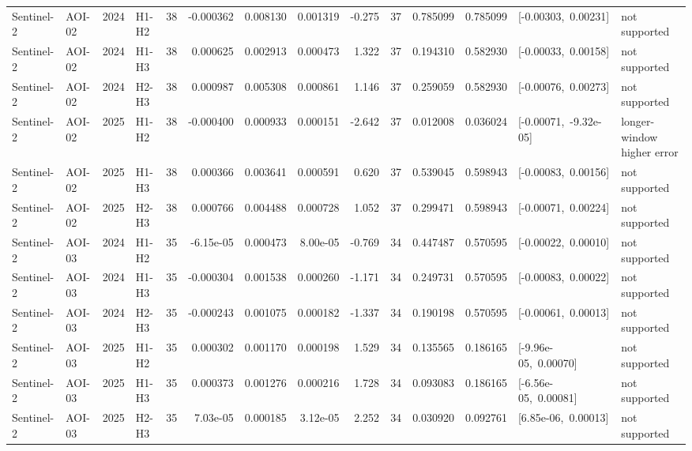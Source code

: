\begin{longtable}{llclrrrrrrrrp{2.35cm}p{1.75cm}}
Sentinel-2 & AOI-02 & 2024 & H1-H2 & 38 & -0.000362 & 0.008130 & 0.001319 & -0.275 & 37 & 0.785099 & 0.785099 & \mbox{[-0.00303, 0.00231]} & not supported \\
Sentinel-2 & AOI-02 & 2024 & H1-H3 & 38 & 0.000625 & 0.002913 & 0.000473 & 1.322 & 37 & 0.194310 & 0.582930 & \mbox{[-0.00033, 0.00158]} & not supported \\
Sentinel-2 & AOI-02 & 2024 & H2-H3 & 38 & 0.000987 & 0.005308 & 0.000861 & 1.146 & 37 & 0.259059 & 0.582930 & \mbox{[-0.00076, 0.00273]} & not supported \\
Sentinel-2 & AOI-02 & 2025 & H1-H2 & 38 & -0.000400 & 0.000933 & 0.000151 & -2.642 & 37 & 0.012008 & 0.036024 & \mbox{[-0.00071, -9.32e-05]} & longer-window higher error \\
Sentinel-2 & AOI-02 & 2025 & H1-H3 & 38 & 0.000366 & 0.003641 & 0.000591 & 0.620 & 37 & 0.539045 & 0.598943 & \mbox{[-0.00083, 0.00156]} & not supported \\
Sentinel-2 & AOI-02 & 2025 & H2-H3 & 38 & 0.000766 & 0.004488 & 0.000728 & 1.052 & 37 & 0.299471 & 0.598943 & \mbox{[-0.00071, 0.00224]} & not supported \\
Sentinel-2 & AOI-03 & 2024 & H1-H2 & 35 & -6.15e-05 & 0.000473 & 8.00e-05 & -0.769 & 34 & 0.447487 & 0.570595 & \mbox{[-0.00022, 0.00010]} & not supported \\
Sentinel-2 & AOI-03 & 2024 & H1-H3 & 35 & -0.000304 & 0.001538 & 0.000260 & -1.171 & 34 & 0.249731 & 0.570595 & \mbox{[-0.00083, 0.00022]} & not supported \\
Sentinel-2 & AOI-03 & 2024 & H2-H3 & 35 & -0.000243 & 0.001075 & 0.000182 & -1.337 & 34 & 0.190198 & 0.570595 & \mbox{[-0.00061, 0.00013]} & not supported \\
Sentinel-2 & AOI-03 & 2025 & H1-H2 & 35 & 0.000302 & 0.001170 & 0.000198 & 1.529 & 34 & 0.135565 & 0.186165 & \mbox{[-9.96e-05, 0.00070]} & not supported \\
Sentinel-2 & AOI-03 & 2025 & H1-H3 & 35 & 0.000373 & 0.001276 & 0.000216 & 1.728 & 34 & 0.093083 & 0.186165 & \mbox{[-6.56e-05, 0.00081]} & not supported \\
Sentinel-2 & AOI-03 & 2025 & H2-H3 & 35 & 7.03e-05 & 0.000185 & 3.12e-05 & 2.252 & 34 & 0.030920 & 0.092761 & \mbox{[6.85e-06, 0.00013]} & not supported \\
\end{longtable}
